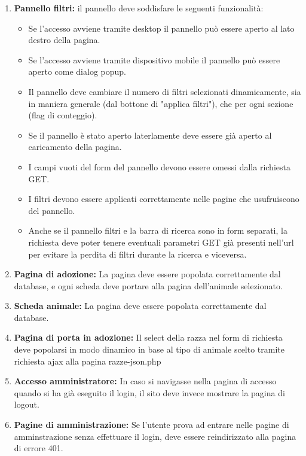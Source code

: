 \documentclass[a4paper,10pt]{article}
\begin{document}
\begin{itemize}
\begin{enumerate}
			In caso di data passata l'utente potrà solo verificare le note della prenotazione.
			\item \textbf{Pannello filtri:} il pannello deve soddisfare le seguenti funzionalità:
			\begin{itemize}
				\item Se l'accesso avviene tramite desktop il pannello può essere aperto al lato destro della pagina.
				\item Se l'accesso avviene tramite dispositivo mobile il pannello può essere aperto come dialog popup.
				\item Il pannello deve cambiare il numero di filtri selezionati dinamicamente, sia in maniera generale (dal bottone di "applica filtri"), che per ogni sezione (flag di conteggio). 
				\item Se il pannello è stato aperto laterlamente deve essere già aperto al caricamento della pagina. 
				\item I campi vuoti del form del pannello devono essere omessi dalla richiesta GET.
				\item I filtri devono essere applicati correttamente nelle pagine che usufruiscono del pannello. 
				\item Anche se il pannello filtri e la barra di ricerca sono in form separati, la richiesta deve poter tenere eventuali parametri GET già presenti nell'url per evitare la perdita di filtri durante la ricerca e viceversa.
			\end{itemize}
			\item \textbf{Pagina di adozione:} La pagina deve essere popolata correttamente dal database, e ogni scheda deve portare alla pagina dell'animale selezionato.
			\item \textbf{Scheda animale:} La pagina deve essere popolata correttamente dal database.
			\item \textbf{Pagina di porta in adozione:} Il select della razza nel form di richiesta deve popolarsi in modo dinamico in base al tipo di animale scelto tramite richiesta ajax alla pagina razze-json.php
			\item \textbf{Accesso amministratore:} In caso si navigasse nella pagina di accesso quando si ha già eseguito il login, il sito deve invece mostrare la pagina di logout.
			\item \textbf{Pagine di amministrazione:} Se l'utente prova ad entrare nelle pagine di amminstrazione senza effettuare il login, deve essere reindirizzato alla pagina di errore 401.
		\end{enumerate}
	\end{itemize}
\end{document}
